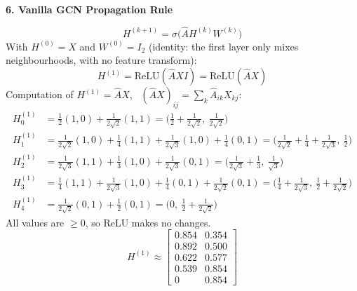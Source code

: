 \documentclass[12pt,a4paper]{article}
\newcommand{\Ahat}{\hat A}
\newcommand{\h}[1]{\par\medskip\textbf{\large #1}\par}
\begin{document}
\h{6. Vanilla GCN Propagation Rule}
\[
  H^{(k+1)} = \sigma\big(\Ahat H^{(k)} W^{(k)}\big)
\]
With $H^{(0)} = X$ and $W^{(0)} = I_2$ (identity: the first layer only mixes neighbourhoods, with no feature transform):
\[
  H^{(1)} = \mathrm{ReLU}(\Ahat X I) = \mathrm{ReLU}(\Ahat X)
\]
Computation of $H^{(1)} = \Ahat X$, \ $(\Ahat X)_{ij} = \sum_k \Ahat_{ik} X_{kj}$:
\begin{align*}
  H^{(1)}_0 &= \tfrac12(1,0) + \tfrac{1}{2\sqrt2}(1,1) = \Big(\tfrac12 + \tfrac{1}{2\sqrt2},\ \tfrac{1}{2\sqrt2}\Big)\\
  H^{(1)}_1 &= \tfrac{1}{2\sqrt2}(1,0) + \tfrac14(1,1) + \tfrac{1}{2\sqrt3}(1,0) + \tfrac14(0,1)
              = \Big(\tfrac{1}{2\sqrt2} + \tfrac14 + \tfrac{1}{2\sqrt3},\ \tfrac12\Big)\\
  H^{(1)}_2 &= \tfrac{1}{2\sqrt3}(1,1) + \tfrac13(1,0) + \tfrac{1}{2\sqrt3}(0,1) = \Big(\tfrac{1}{2\sqrt3} + \tfrac13,\ \tfrac{1}{\sqrt3}\Big)\\
  H^{(1)}_3 &= \tfrac14(1,1) + \tfrac{1}{2\sqrt3}(1,0) + \tfrac14(0,1) + \tfrac{1}{2\sqrt2}(0,1)
              = \Big(\tfrac14 + \tfrac{1}{2\sqrt3},\ \tfrac12 + \tfrac{1}{2\sqrt2}\Big)\\
  H^{(1)}_4 &= \tfrac{1}{2\sqrt2}(0,1) + \tfrac12(0,1) = \Big(0,\ \tfrac12 + \tfrac{1}{2\sqrt2}\Big)
\end{align*}
All values are $\ge 0$, so ReLU makes no changes.
\[
  H^{(1)} \approx \begin{bmatrix}
  0.854 & 0.354\\ 0.892 & 0.500\\ 0.622 & 0.577\\ 0.539 & 0.854\\ 0 & 0.854
  \end{bmatrix}
\]
\end{document}

